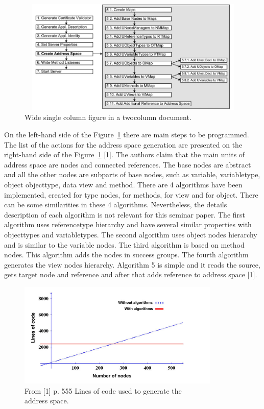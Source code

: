\documentclass[conference]{IEEEtran}
\begin{document}
\begin{figure}[ht]
\centering
\includegraphics[height=55mm, width = 5in]{Figures/Steps}\quad
\caption{\label{f:Steps}Wide single column figure in a twocolumn document.}
\end{figure}


On the left-hand side of the Figure~\ref{f:Steps} there are main steps to be programmed. The list of the actions for the address space generation are presented on the right-hand side of the Figure~\ref{f:Steps} [1]. The authors claim that the main units of address space are nodes and connected references. The base nodes are abstract and all the other nodes are subparts of base nodes, such as variable, variabletype, object objecttype, data view and method. There are 4 algorithms have been implemented, created for type nodes, for methods, for view and for object. There can be some similarities in these 4 algorithms. Nevertheless, the details description of each algorithm is not relevant for this seminar paper. The first algorithm uses referencetype hierarchy and have several similar properties with objecttypes and variabletypes. The second algorithm uses object nodes hierarchy and is similar to the variable nodes. The third algorithm is based on method nodes. This algorithm adds the nodes in success groups. The fourth algorithm generates the view nodes hierarchy. Algorithm 5 is simple and it reads the source, gets target node and reference and after that adds reference to address space [1]. 

\begin{figure}[ht]
\centering
\includegraphics[height=50mm]{Figures/NodeAlgorithm}\quad
\caption[Subfigure example]{\label{f:NodeAlgorithm}From [1] p. 555 Lines of code used to generate the\\ address space.}
\end{figure}
\end{document}
